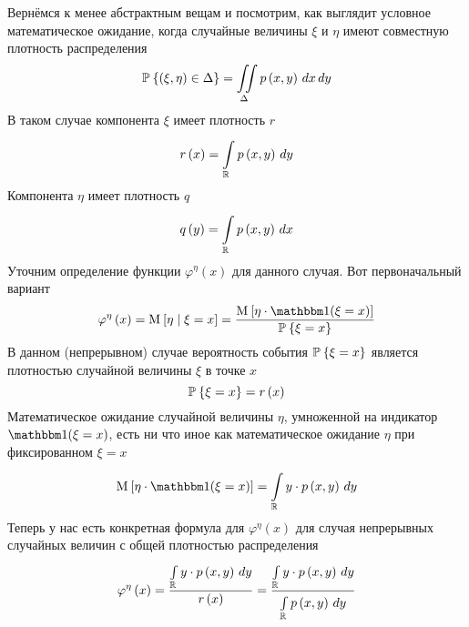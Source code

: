 Вернёмся к менее абстрактным вещам и посмотрим,
как выглядит условное математическое ожидание,
когда случайные величины $\xi$ и $\eta$ имеют совместную плотность распределения
$$\Probability{\left( \xi, \eta \right) \in \Delta}
  = \iint\limits_\Delta\pdf{x,y} \, dx \, dy$$
В таком случае компонента $\xi$ имеет плотность $r$
$$r\left( x \right) = \integral{\mathbb{R}}{}{y}{\pdf{x,y}}$$
Компонента $\eta$ имеет плотность $q$
$$q\left( y \right) = \integral{\mathbb{R}}{}{x}{\pdf{x,y}}$$
Уточним определение функции $\varphi^{\eta}\left( x \right)$
для данного случая. Вот первоначальный вариант
$$\varphi^{\eta}\left( x \right)
  = \Mean{ \eta \mcond \xi=x }
  = \frac{\Mean{ \eta \cdot \indicator{\xi=x} }}
      {\Probability{\xi=x}}$$
В данном (непрерывном) случае вероятность события $\Probability{\xi=x}$ является
плотностью случайной величины $\xi$ в точке $x$
$$\Probability{\xi=x} = r\left( x \right)$$
Математическое ожидание случайной величины $\eta$,
умноженной на индикатор $\indicator{\xi=x}$,
есть ни что иное как математическое ожидание $\eta$ при фиксированном $\xi=x$
$$\Mean{ \eta \cdot \indicator{\xi=x} }
  = \integral{\mathbb{R}}{}{y}{y \cdot \pdf{x,y}}$$
Теперь у нас есть конкретная формула для $\varphi^{\eta}\left( x \right)$
для случая непрерывных случайных величин с общей плотностью распределения
\begin{equation}\label{phiIntegral}
  \varphi^{\eta}\left( x \right)
      = \frac{\integral{\mathbb{R}}{}{y}{y \cdot \pdf{x,y}}}
      {r\left( x \right)}
      = \frac{\integral{\mathbb{R}}{}{y}{y \cdot \pdf{x,y}}}
      {\integral{\mathbb{R}}{}{y}{\pdf{x,y}}}
\end{equation}
